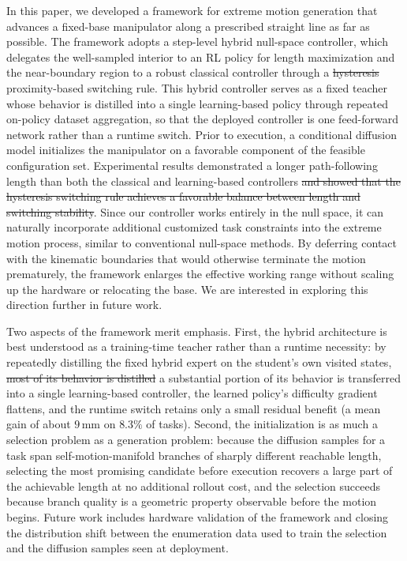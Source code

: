 \documentclass[journal, twoside]{IEEEtran}
\newcommand{\rev}[1]{\begingroup\color{magenta}#1\endgroup}
\newcommand{\rst}[1]{{\color{rstcolor}#1}}
\begin{document}
In this paper, we developed a framework for extreme motion generation that advances a fixed-base manipulator along a prescribed straight line as far as possible. The framework adopts a step-level hybrid null-space controller, which delegates the well-sampled interior to an RL policy for length maximization and the near-boundary region to a robust classical controller through a \sout{hysteresis} \rst{proximity-based} switching rule. \rst{This hybrid controller serves as a fixed teacher whose behavior is distilled into a single learning-based policy through repeated on-policy dataset aggregation, so that the deployed controller is one feed-forward network rather than a runtime switch.} Prior to execution, a conditional diffusion model initializes the manipulator on a favorable component of the feasible configuration set. Experimental results demonstrated a longer path-following length than both the classical and learning-based controllers \sout{and showed that the hysteresis switching rule achieves a favorable balance between length and switching stability}. Since our controller works entirely in the null space, it can naturally incorporate additional customized task constraints into the extreme motion process, similar to conventional null-space methods. By deferring contact with the kinematic boundaries that would otherwise terminate the motion prematurely, the framework enlarges the effective working range without scaling up the hardware or relocating the base. We are interested in exploring this direction further in future work.

\rev{Two aspects of the framework merit emphasis. First, the hybrid architecture is best understood as a training-time teacher rather than a runtime necessity: by repeatedly distilling the fixed hybrid expert on the student's own visited states, \sout{most of its behavior is distilled} \rst{a substantial portion of its behavior is transferred} into a single learning-based controller, the learned policy's difficulty gradient flattens, and the runtime switch retains only a small residual benefit (a mean gain of about $9$\,mm on $8.3\%$ of tasks). Second, the initialization is as much a selection problem as a generation problem: because the diffusion samples for a task span self-motion-manifold branches of sharply different reachable length, selecting the most promising candidate before execution recovers a large part of the achievable length at no additional rollout cost, and the selection succeeds because branch quality is a geometric property observable before the motion begins. Future work includes hardware validation of the framework and closing the distribution shift between the enumeration data used to train the selection and the diffusion samples seen at deployment.}
\end{document}
